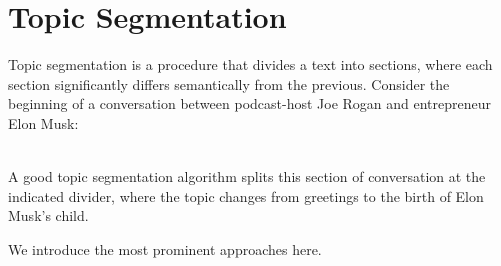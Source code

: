 \section{Topic Segmentation \label{ssec: topic segmentation}}
Topic segmentation is a procedure that divides a text into sections, where each section significantly differs semantically from the previous. 
Consider the beginning of a conversation between podcast-host Joe Rogan and entrepreneur Elon Musk:\\


\vspace{1em} 
\hspace{2.5em} 
\vspace{1em}
        
\vspace{-0.3em}\\

\noindent A good topic segmentation algorithm splits this section of conversation at the indicated divider, where the topic changes from greetings to the birth of Elon Musk's child.

We introduce the most prominent approaches here.

    
